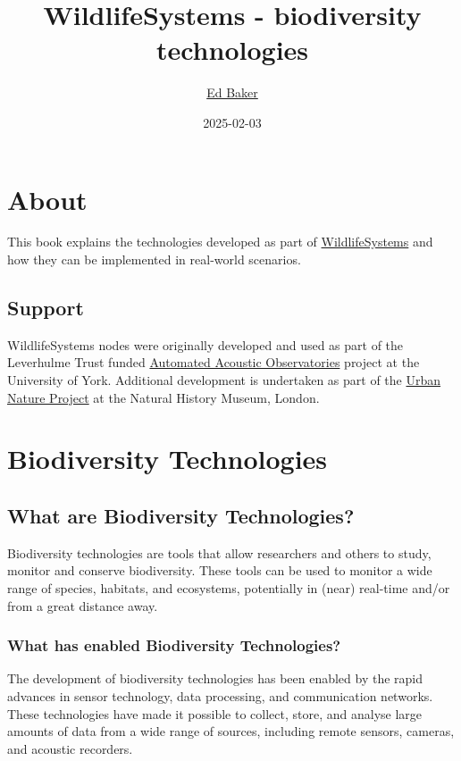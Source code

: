 \documentclass[
]{book}
\title{WildlifeSystems - biodiversity technologies}
\author{\href{https://ebaker.me.uk}{Ed Baker}}
\date{2025-02-03}
\begin{document}
\maketitle

{
\setcounter{tocdepth}{1}
\tableofcontents
}
\chapter*{About}\label{about}

This book explains the technologies developed as part of \href{https://wildlife.systems}{WildlifeSystems} and how they can be implemented in real-world scenarios.

\section*{Support}\label{support}

WildlifeSystems nodes were originally developed and used as part of the Leverhulme Trust funded \href{https://ebaker.me.uk/aao}{Automated Acoustic Observatories} project at the University of York. Additional development is undertaken as part of the \href{https://www.nhm.ac.uk/about-us/urban-nature-project.html}{Urban Nature Project} at the Natural History Museum, London.

\chapter{Biodiversity Technologies}\label{biodiversity-technologies}

\section{What are Biodiversity Technologies?}\label{what-are-biodiversity-technologies}

Biodiversity technologies are tools that allow researchers and others to study, monitor and
conserve biodiversity. These tools can be used to monitor a wide range of species, habitats, and ecosystems, potentially in (near) real-time and/or from a great distance away.

\subsection{What has enabled Biodiversity Technologies?}\label{what-has-enabled-biodiversity-technologies}

The development of biodiversity technologies has been enabled by the rapid advances in sensor technology, data processing, and communication networks. These technologies have made it possible to collect, store, and analyse large amounts of data from a wide range of sources, including remote sensors, cameras, and acoustic recorders.
\end{document}
